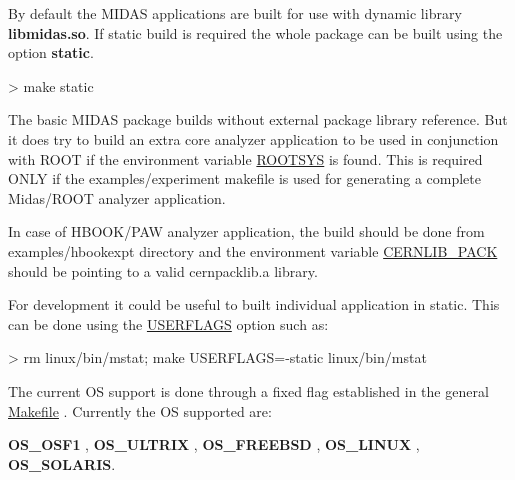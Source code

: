 \begin{DoxyItemize}
\item By default the MIDAS applications are built for use with dynamic library {\bfseries libmidas.so}. If static build is required the whole package can be built using the option {\bfseries static}. 
\begin{DoxyCode}
> make static
\end{DoxyCode}

\end{DoxyItemize}


\begin{DoxyItemize}
\item The basic MIDAS package builds without external package library reference. But it does try to build an extra core analyzer application to be used in conjunction with ROOT if the environment variable \hyperlink{BuildingOptions_BO_ROOTSYS}{ROOTSYS} is found. This is required ONLY if the examples/experiment makefile is used for generating a complete Midas/ROOT analyzer application.
\end{DoxyItemize}


\begin{DoxyItemize}
\item In case of HBOOK/PAW analyzer application, the build should be done from examples/hbookexpt directory and the environment variable \hyperlink{BuildingOptions_BO_CERNLIB_PACK}{CERNLIB\_\-PACK} should be pointing to a valid cernpacklib.a library.
\end{DoxyItemize}


\begin{DoxyItemize}
\item For development it could be useful to built individual application in static. This can be done using the \hyperlink{BuildingOptions_BO_USERFLAGS}{USERFLAGS} option such as: 
\begin{DoxyCode}
> rm linux/bin/mstat; make USERFLAGS=-static linux/bin/mstat
\end{DoxyCode}

\end{DoxyItemize}


\begin{DoxyItemize}
\item The current OS support is done through a fixed flag established in the general \hyperlink{Makefile}{Makefile} . Currently the OS supported are:
\begin{DoxyItemize}
\item {\bfseries OS\_\-OSF1} , {\bfseries OS\_\-ULTRIX} , {\bfseries OS\_\-FREEBSD} , {\bfseries OS\_\-LINUX} , {\bfseries OS\_\-SOLARIS}.
\end{DoxyItemize}
\end{DoxyItemize}


